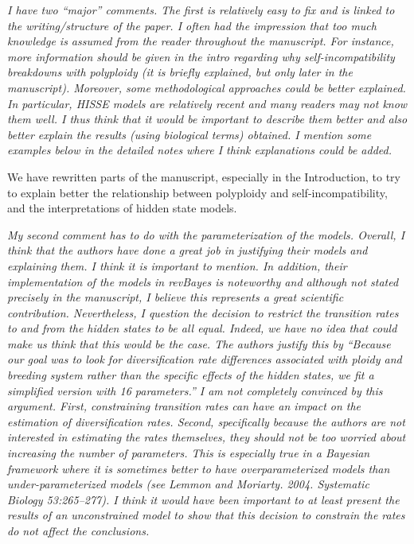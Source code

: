 \documentclass[11pt]{article}
\renewenvironment{quote}{\bigskip\noindent\itshape\ignorespaces}{\smallskip}
\begin{document}
\begin{quote}
I have two ``major'' comments.
The first is relatively easy to fix and is linked to the writing/structure of the paper.
I often had the impression that too much knowledge is assumed from the reader throughout the manuscript.
For instance, more information should be given in the intro regarding why self-incompatibility breakdowns with polyploidy (it is briefly explained, but only later in the manuscript).
Moreover, some methodological approaches could be better explained.
In particular, HISSE models are relatively recent and many readers may not know them well.
I thus think that it would be important to describe them better and also better explain the results (using biological terms) obtained.
I mention some examples below in the detailed notes where I think explanations could be added.
\end{quote}

We have rewritten parts of the manuscript, especially in the Introduction, to try to explain better the relationship between polyploidy and self-incompatibility, and the interpretations of hidden state models.

\begin{quote}
My second comment has to do with the parameterization of the models.
Overall, I think that the authors have done a great job in justifying their models and explaining them.
I think it is important to mention.
In addition, their implementation of the models in revBayes is noteworthy and although not stated precisely in the manuscript, I believe this represents a great scientific contribution. 
Nevertheless, I question the decision to restrict the transition rates to and from the hidden states to be all equal.
Indeed, we have no idea that could make us think that this would be the case.
The authors justify this by ``Because our goal was to look for diversification rate differences associated with ploidy and breeding system rather than the specific effects of the hidden states, we fit a simplified version with 16 parameters.''
I am not completely convinced by this argument.
First, constraining transition rates can have an impact on the estimation of diversification rates.
Second, specifically because the authors are not interested in estimating the rates themselves, they should not be too worried about increasing the number of parameters.
This is especially true in a Bayesian framework where it is sometimes better to have overparameterized models than under-parameterized models (see Lemmon and Moriarty. 2004. Systematic Biology 53:265–277).
I think it would have been important to at least present the results of an unconstrained model to show that this decision to constrain the rates do not affect the conclusions.
\end{quote}
\end{document}
